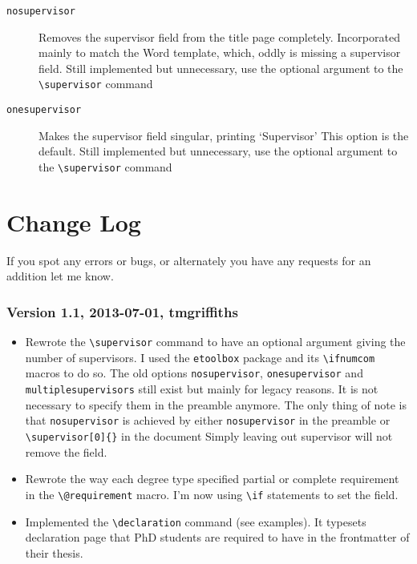 \documentclass[12pt,oneside]{article}
\newcommand{\oporcom}[1]{\texttt{\color{RoyalBlue}#1}} %
\begin{document}
\begin{description}
    \item[\oporcom{nosupervisor}]
    Removes the supervisor field from the title page completely. Incorporated mainly to match the Word template, which, oddly is missing a supervisor field. Still implemented but unnecessary, use the optional argument to the \oporcom{\textbackslash{}supervisor} command
    
    \item[\oporcom{onesupervisor}]
    Makes the supervisor field singular, printing `Supervisor' This option is the default. Still implemented but unnecessary, use the optional argument to the \oporcom{\textbackslash{}supervisor} command
\end{description}

\section{Change Log}
If you spot any errors or bugs, or alternately you have any requests for an addition let me know.
\subsubsection*{Version 1.1, 2013-07-01, tmgriffiths}
\begin{itemize}
    \item Rewrote the \oporcom{\textbackslash{}supervisor} command to have an optional argument giving the number of supervisors. I used the \texttt{etoolbox} package and its \texttt{\textbackslash{}ifnumcom} macros to do so. The old options \oporcom{nosupervisor}, \oporcom{onesupervisor} and \oporcom{multiplesupervisors} still exist but mainly for legacy reasons. It is not necessary to specify them in the preamble anymore. The only thing of note is that \oporcom{nosupervisor} is achieved by either \oporcom{nosupervisor} in the preamble or \oporcom{\textbackslash{}supervisor}\texttt{[0]\{\}} in the document Simply leaving out supervisor will not remove the field.
    \item Rewrote the way each degree type specified partial or complete requirement in the \oporcom{\textbackslash{}@requirement} macro. I'm now using \texttt{\textbackslash{}if} statements to set the field.
    \item Implemented the \oporcom{\textbackslash{}declaration} command (see examples). It typesets declaration page that PhD students are required to have in the frontmatter of their thesis.
\end{itemize}
\end{document}
